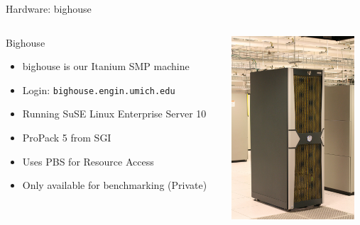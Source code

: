 \documentclass[handout]{beamer}
\begin{document}
  \begin{frame}{Hardware: bighouse}
   \begin{columns}[c]
    \begin{column}{7cm}
    \begin{block}{Bighouse}
    \begin{itemize}
      \item bighouse is our Itanium SMP machine
      \item Login: \texttt{bighouse.engin.umich.edu}
      \item Running SuSE Linux Enterprise Server 10
      \item ProPack 5 from SGI
      \item Uses PBS for Resource Access
      \item Only available for benchmarking (Private)
    \end{itemize}
   \end{block}
   \end{column}
   \begin{column}{5cm}
    \begin{center}\includegraphics[height=2.7in]{../bighouse/tallbighouse} \end{center}
   \end{column}
   \end{columns}
  \end{frame}
\end{document}
